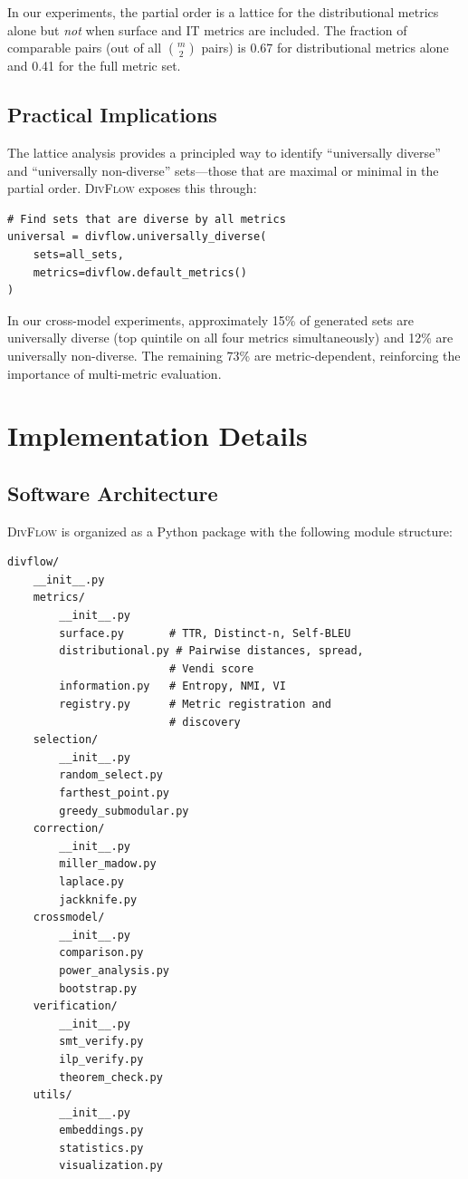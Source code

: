 \documentclass[11pt,a4paper]{article}
\newcommand{\divflow}{\textsc{DivFlow}}
\begin{document}
In our experiments, the partial order is a lattice for
the distributional metrics alone but \emph{not} when
surface and IT metrics are included.  The fraction of
comparable pairs (out of all $\binom{m}{2}$ pairs)
is 0.67 for distributional metrics alone and 0.41 for
the full metric set.

\subsection{Practical Implications}

The lattice analysis provides a principled way to
identify ``universally diverse'' and ``universally
non-diverse'' sets---those that are maximal or minimal
in the partial order.  \divflow{} exposes this through:

\begin{verbatim}
# Find sets that are diverse by all metrics
universal = divflow.universally_diverse(
    sets=all_sets,
    metrics=divflow.default_metrics()
)
\end{verbatim}

In our cross-model experiments, approximately 15\% of
generated sets are universally diverse (top quintile
on all four metrics simultaneously) and 12\% are
universally non-diverse.  The remaining 73\% are
metric-dependent, reinforcing the importance of
multi-metric evaluation.

\section{Implementation Details}\label{app:implementation}

\subsection{Software Architecture}

\divflow{} is organized as a Python package with the
following module structure:

\begin{verbatim}
divflow/
    __init__.py
    metrics/
        __init__.py
        surface.py       # TTR, Distinct-n, Self-BLEU
        distributional.py # Pairwise distances, spread,
                         # Vendi score
        information.py   # Entropy, NMI, VI
        registry.py      # Metric registration and
                         # discovery
    selection/
        __init__.py
        random_select.py
        farthest_point.py
        greedy_submodular.py
    correction/
        __init__.py
        miller_madow.py
        laplace.py
        jackknife.py
    crossmodel/
        __init__.py
        comparison.py
        power_analysis.py
        bootstrap.py
    verification/
        __init__.py
        smt_verify.py
        ilp_verify.py
        theorem_check.py
    utils/
        __init__.py
        embeddings.py
        statistics.py
        visualization.py
\end{verbatim}
\end{document}

